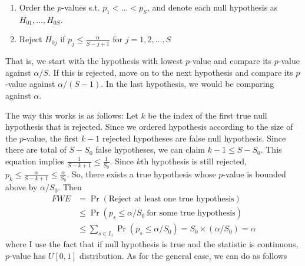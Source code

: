 \begin{enumerate}
\item Order the $p$-values s.t. $p_1<...<p_S$, and denote each null hypothesis as $H_{01},...,H_{0S}$. 
\item Reject $H_{0j}$ if $p_j \leq \frac{\alpha}{S-j+1}$ for $j=1,2,...,S$
\end{enumerate}
That is, we start with the hypothesis with lowest $p$-value and compare its $p$-value against $\alpha/S$. If this is rejected, move on to the next hypothesis and compare its $p$-value against $\alpha/(S-1)$. In the last hypothesis, we would be comparing against $\alpha$. \par
The way this works is as follows: Let $k$ be the index of the first true null hypothesis that is rejected. Since we ordered hypothesis according to the size of the $p$-value, the first $k-1$ rejected hypotheses are false null hypothesis. Since there are total of $S-S_0$ false hypotheses, we can claim $k-1\leq S-S_0$. This equation implies $\frac{1}{S-k+1}\leq\frac{1}{S_0}$. Since $k$th hypothesis is still rejected, $p_k\leq\frac{\alpha}{S-k+1}\leq \frac{\alpha}{S_0}$. So, there exists a true hypothesis whose $p$-value is bounded above by $\alpha/S_0$.  Then
\begin{align*}
FWE&=\Pr(\text{Reject at least one true hypothesis})\\
&\leq \Pr(p_s\leq \alpha/S_0\ \text{for some true hypothesis})\\
&\leq \sum_{s\in I_0}\Pr(p_s\leq \alpha/S_0) = S_0\times (\alpha/S_0)=\alpha
\end{align*}
where I use the fact that if null hypothesis is true and the statistic is continuous, $p$-value has $U[0,1]$ distribution. As for the general case, we can do as follows
